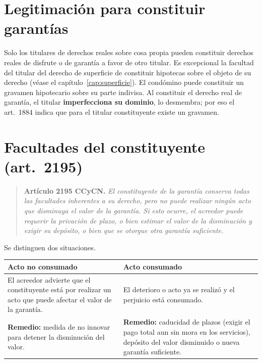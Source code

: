 \documentclass[12pt,oneside]{book}
\begin{document}
\section{Legitimación para constituir garantías}

Solo los titulares de derechos reales sobre cosa propia pueden constituir derechos reales de disfrute o de garantía a favor de otro titular. Es excepcional la facultad del titular del derecho de superficie de constituir hipotecas sobre el objeto de su derecho (véase el capítulo~\ref{cap:superficie}). El condómino puede constituir un gravamen hipotecario sobre su parte indivisa. Al constituir el derecho real de garantía, el titular \textbf{imperfecciona su dominio}, lo desmembra; por eso el art.~1884 indica que para el titular constituyente existe un gravamen.

\section{Facultades del constituyente (art.~2195)}

\begin{quote}
\textbf{Artículo 2195 CCyCN.} \textit{El constituyente de la garantía conserva todas las facultades inherentes a su derecho, pero no puede realizar ningún acto que disminuya el valor de la garantía. Si esto ocurre, el acreedor puede requerir la privación de plazo, o bien estimar el valor de la disminución y exigir su depósito, o bien que se otorgue otra garantía suficiente.}
\end{quote}

Se distinguen dos situaciones.

\begin{table}[H]
\centering
\begin{tabularx}{\textwidth}{@{}LL@{}}
\toprule
\textbf{Acto no consumado} & \textbf{Acto consumado} \\
\midrule
El acreedor advierte que el constituyente está por realizar un acto que puede afectar el valor de la garantía. & El deterioro o acto ya se realizó y el perjuicio está consumado. \\
\addlinespace
\textbf{Remedio:} medida de no innovar para detener la disminución del valor. & \textbf{Remedio:} caducidad de plazos (exigir el pago total aun sin mora en los servicios), depósito del valor disminuido o nueva garantía suficiente. \\
\bottomrule
\end{tabularx}
\end{table}
\end{document}
